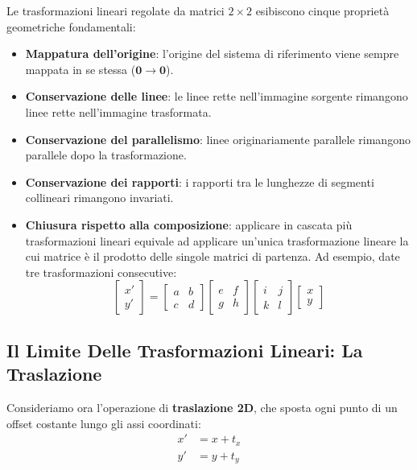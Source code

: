 ﻿\documentclass[11pt, a4paper]{article}
\begin{document}
Le trasformazioni lineari regolate da matrici $2 \times 2$ esibiscono cinque proprietà geometriche fondamentali:
\begin{itemize}[noitemsep]
    \item \textbf{Mappatura dell'origine}: l'origine del sistema di riferimento viene sempre mappata in se stessa ($\bm{0} \to \bm{0}$).
    \item \textbf{Conservazione delle linee}: le linee rette nell'immagine sorgente rimangono linee rette nell'immagine trasformata.
    \item \textbf{Conservazione del parallelismo}: linee originariamente parallele rimangono parallele dopo la trasformazione.
    \item \textbf{Conservazione dei rapporti}: i rapporti tra le lunghezze di segmenti collineari rimangono invariati.
    \item \textbf{Chiusura rispetto alla composizione}: applicare in cascata più trasformazioni lineari equivale ad applicare un'unica trasformazione lineare la cui matrice è il prodotto delle singole matrici di partenza. Ad esempio, date tre trasformazioni consecutive:
    \[
    \begin{bmatrix} x' \\ y' \end{bmatrix} = \begin{bmatrix} a & b \\ c & d \end{bmatrix} \begin{bmatrix} e & f \\ g & h \end{bmatrix} \begin{bmatrix} i & j \\ k & l \end{bmatrix} \begin{bmatrix} x \\ y \end{bmatrix}
    \]
\end{itemize}

\subsection{Il Limite Delle Trasformazioni Lineari: La Traslazione}

Consideriamo ora l'operazione di \textbf{traslazione 2D}, che sposta ogni punto di un offset costante lungo gli assi coordinati:
\[
\begin{aligned}
x' &= x + t_x \\
y' &= y + t_y
\end{aligned}
\]
\end{document}
